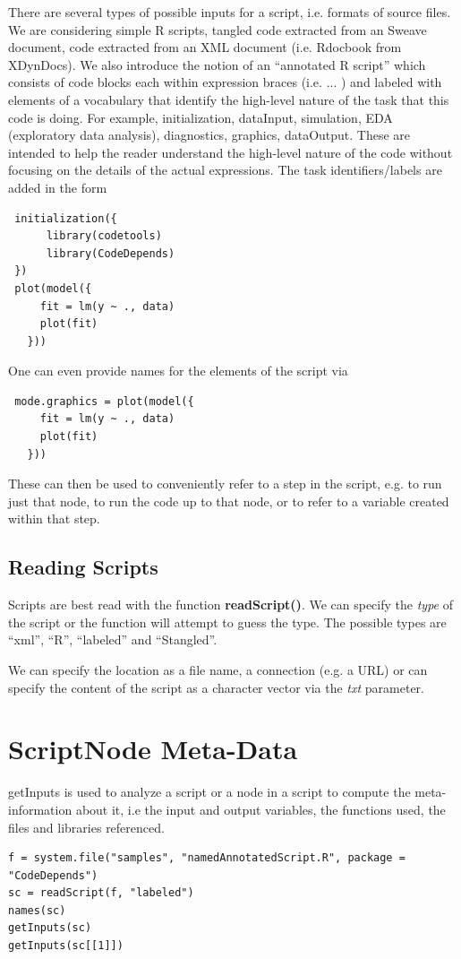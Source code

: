 \documentclass{article}
\def\Rfunc#1{\textbf{#1()}}
\def\Rarg#1{\textit{#1}}
\begin{document}
There are several types of possible inputs for a script, i.e. formats
of source files.  We are considering simple R scripts, tangled code
extracted from an Sweave document, code extracted from an XML document
(i.e. Rdocbook from XDynDocs).  We also introduce the notion of an
``annotated R script'' which consists of code blocks each within
expression braces (i.e. { ... }) and labeled with elements of a
vocabulary that identify the high-level nature of the task that this
code is doing.  For example, initialization, dataInput, simulation,
EDA (exploratory data analysis), diagnostics, graphics, dataOutput.
These are intended to help the reader understand the high-level nature
of the code without focusing on the details of the actual expressions.
The task identifiers/labels  are added in the form
\begin{verbatim}
 initialization({
      library(codetools)
      library(CodeDepends)
 })
 plot(model({
     fit = lm(y ~ ., data)    
     plot(fit)
   }))
\end{verbatim}
One can even provide names for the elements of the script via
\begin{verbatim}
 mode.graphics = plot(model({
     fit = lm(y ~ ., data)    
     plot(fit)
   }))
\end{verbatim}
These can then be used to conveniently refer to a step
in the script, e.g. to run just that node, to run the code
up to that node, or to refer to a variable created within that
step.

\subsection{Reading Scripts}
Scripts are best read with the function \Rfunc{readScript}.  We can
specify the \Rarg{type} of the script or the function will attempt to guess
the type.
The possible types are ``xml'', ``R'', ``labeled'' and ``Stangled''.

We can specify the location as a file name, a connection (e.g. a URL)
or can specify the content of the script as a character vector via the
\Rarg{txt} parameter.



\section{ScriptNode Meta-Data}
getInputs is used to analyze a script or a node in a script
to compute the meta-information  about it, i.e
the input and output variables, the functions used, 
the files and libraries referenced.
\begin{verbatim}
f = system.file("samples", "namedAnnotatedScript.R", package = "CodeDepends")
sc = readScript(f, "labeled")
names(sc)
getInputs(sc)
getInputs(sc[[1]])
\end{verbatim}
\end{document}
